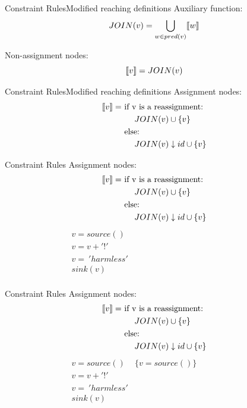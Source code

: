 \begin{frame}{Constraint Rules}{Modified reaching definitions}
  Auxiliary function:
  \[ JOIN(v) = \bigcup_{ w \in pred(v)} \llbracket w \rrbracket \]

  Non-assignment nodes:
    \[ \llbracket v \rrbracket = JOIN(v) \]
\end{frame}


\begin{frame}{Constraint Rules}{Modified reaching definitions}
    Assignment nodes:
  \begin{align*}
  \llbracket v \rrbracket = &\text{ if v is a reassignment:}\\
  &\phantom{==}JOIN(v) \cup \{ v \}\\
  &\text{ else:}\\
  &\phantom{==}JOIN(v) \downarrow id \cup \{ v \}\\
  \end{align*}
\end{frame}

\begin{frame}{Constraint Rules}
  Assignment nodes:
  \begin{align*}
  \llbracket v \rrbracket = &\text{ if v is a reassignment:}\\
  &\phantom{==}JOIN(v) \cup \{ v \}\\
  &\text{ else:}\\
  &\phantom{==}JOIN(v) \downarrow id \cup \{ v \}\\
  \end{align*}
  \noindent\makebox[\linewidth]{\rule{\textwidth}{0.4pt}}
  \[
  \begin{array}{ll}
    v = source() &\\
    v = v + '!' & \phantom{ \{v = source(), v = v + '!'\}}\\ 
    v = \ 'harmless' & \\
    sink(v)& \\
  \end{array}
  \]
\end{frame}

\begin{frame}{Constraint Rules}
  Assignment nodes:
  \begin{align*}
  \llbracket v \rrbracket = &\text{ if v is a reassignment:}\\
  &\phantom{==}JOIN(v) \cup \{ v \}\\
  &\text{ else:}\\
  &\phantom{==}JOIN(v) \downarrow id \cup \{ v \}\\
  \end{align*}
    \noindent\makebox[\linewidth]{\rule{\textwidth}{0.4pt}}
  \[
  \begin{array}{ll}
    v = source() & \{v = source()\}\\
    v = v + '!' &\phantom{ \{v = source(), v = v + '!'\}}\\
    v = \ 'harmless' & \\
    sink(v)& \\
  \end{array}
  \]
\end{frame}

